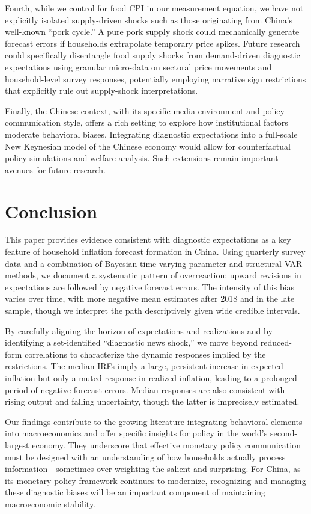 \documentclass[12pt]{article}
\begin{document}
Fourth, while we control for food CPI in our measurement equation, we have not explicitly isolated supply-driven shocks such as those originating from China's well-known ``pork cycle.'' A pure pork supply shock could mechanically generate forecast errors if households extrapolate temporary price spikes. Future research could specifically disentangle food supply shocks from demand-driven diagnostic expectations using granular micro-data on sectoral price movements and household-level survey responses, potentially employing narrative sign restrictions that explicitly rule out supply-shock interpretations.

Finally, the Chinese context, with its specific media environment and policy communication style, offers a rich setting to explore how institutional factors moderate behavioral biases. Integrating diagnostic expectations into a full-scale New Keynesian model of the Chinese economy would allow for counterfactual policy simulations and welfare analysis. Such extensions remain important avenues for future research.

\section{Conclusion}\label{sec:conclusion}
This paper provides evidence consistent with diagnostic expectations as a key feature of household inflation forecast formation in China. Using quarterly survey data and a combination of Bayesian time-varying parameter and structural VAR methods, we document a systematic pattern of overreaction: upward revisions in expectations are followed by negative forecast errors. The intensity of this bias varies over time, with more negative mean estimates after 2018 and in the late sample, though we interpret the path descriptively given wide credible intervals.

By carefully aligning the horizon of expectations and realizations and by identifying a set-identified ``diagnostic news shock,'' we move beyond reduced-form correlations to characterize the dynamic responses implied by the restrictions. The median IRFs imply a large, persistent increase in expected inflation but only a muted response in realized inflation, leading to a prolonged period of negative forecast errors. Median responses are also consistent with rising output and falling uncertainty, though the latter is imprecisely estimated.

Our findings contribute to the growing literature integrating behavioral elements into macroeconomics and offer specific insights for policy in the world's second-largest economy. They underscore that effective monetary policy communication must be designed with an understanding of how households actually process information—sometimes over-weighting the salient and surprising. For China, as its monetary policy framework continues to modernize, recognizing and managing these diagnostic biases will be an important component of maintaining macroeconomic stability.
\end{document}
